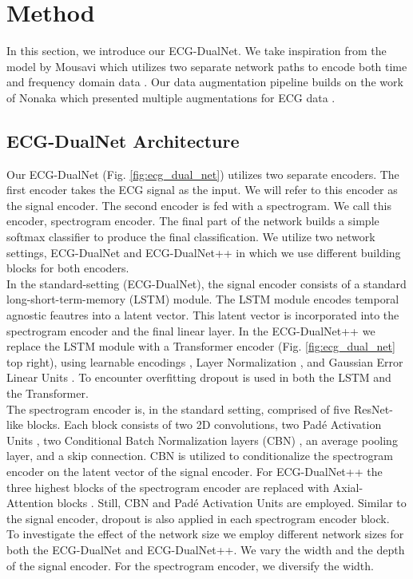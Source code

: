 \section{Method} \label{sec:method}

In this section, we introduce our ECG-DualNet. We take inspiration from the model by Mousavi \etal which utilizes two separate network paths to encode both time and frequency domain data \cite{Mousavi2019}. Our data augmentation pipeline builds on the work of Nonaka \etal which presented multiple augmentations for ECG data \cite{Nonaka2020}.

\subsection{ECG-DualNet Architecture} \label{subsec:ecg_dualnet}

Our ECG-DualNet (Fig. \ref{fig:ecg_dual_net}) utilizes two separate encoders. The first encoder takes the ECG signal as the input. We will refer to this encoder as the signal encoder. The second encoder is fed with a spectrogram. We call this encoder, spectrogram encoder. The final part of the network builds a simple softmax classifier to produce the final classification. We utilize two network settings, ECG-DualNet and ECG-DualNet++ in which we use different building blocks for both encoders. \\
\indent In the standard-setting (ECG-DualNet), the signal encoder consists of a standard long-short-term-memory (LSTM) \cite{Hochreiter1997} module. The LSTM module encodes temporal agnostic feautres into a latent vector. This latent vector is incorporated into the spectrogram encoder and the final linear layer. In the ECG-DualNet++ we replace the LSTM module with a Transformer encoder \cite{Vaswani2017, Dosovitskiy2020} (Fig. \ref{fig:ecg_dual_net} top right), using learnable encodings \cite{Vaswani2017, Reich2020b}, Layer Normalization \cite{Ba2016}, and Gaussian Error Linear Units \cite{Hendrycks2016}. To encounter overfitting dropout \cite{Srivastava2014} is used in both the LSTM and the Transformer. \\
\indent The spectrogram encoder is, in the standard setting, comprised of five ResNet-like \cite{He2016} blocks. Each block consists of two 2D convolutions, two Pad\'{e} Activation Units \cite{Molina2020}, two Conditional Batch Normalization layers (CBN) \cite{De2017}, an average pooling layer, and a skip connection. CBN is utilized to conditionalize the spectrogram encoder on the latent vector of the signal encoder. For ECG-DualNet++ the three highest blocks of the spectrogram encoder are replaced with Axial-Attention blocks \cite{Wang2020}. Still, CBN and Pad\'{e} Activation Units are employed. Similar to the signal encoder, dropout \cite{Srivastava2014} is also applied in each spectrogram encoder block. \\
\indent To investigate the effect of the network size we employ different network sizes for both the ECG-DualNet and ECG-DualNet++. We vary the width and the depth of the signal encoder. For the spectrogram encoder, we diversify the width.

